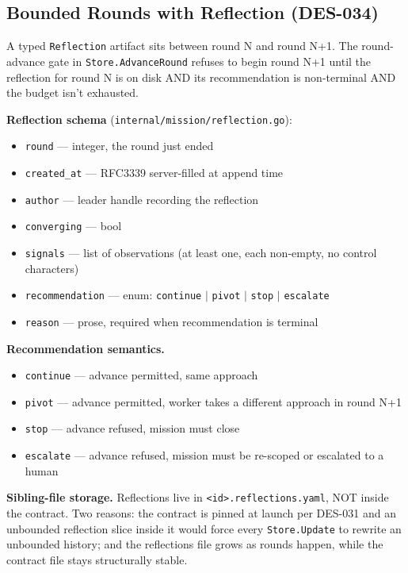 \documentclass[a4paper,10pt]{article}
\newcommand{\field}[1]{\texttt{#1}}
\newcommand{\fpath}[1]{\texttt{#1}}
\begin{document}
\subsection{Bounded Rounds with Reflection (DES-034)}

A typed \texttt{Reflection} artifact sits between round N and round
N+1.  The round-advance gate in \texttt{Store.AdvanceRound} refuses
to begin round N+1 until the reflection for round N is on disk AND
its recommendation is non-terminal AND the budget isn't exhausted.

\textbf{Reflection schema} (\fpath{internal/mission/reflection.go}):

\begin{itemize}
  \item \field{round} --- integer, the round just ended
  \item \field{created\_at} --- RFC3339 server-filled at append time
  \item \field{author} --- leader handle recording the reflection
  \item \field{converging} --- bool
  \item \field{signals} --- list of observations (at least one,
    each non-empty, no control characters)
  \item \field{recommendation} --- enum:
    \texttt{continue} $|$ \texttt{pivot} $|$ \texttt{stop} $|$
    \texttt{escalate}
  \item \field{reason} --- prose, required when recommendation is
    terminal
\end{itemize}

\textbf{Recommendation semantics.}

\begin{itemize}
  \item \texttt{continue} --- advance permitted, same approach
  \item \texttt{pivot} --- advance permitted, worker takes a
    different approach in round N+1
  \item \texttt{stop} --- advance refused, mission must close
  \item \texttt{escalate} --- advance refused, mission must be
    re-scoped or escalated to a human
\end{itemize}

\textbf{Sibling-file storage.}  Reflections live in
\fpath{<id>.reflections.yaml}, NOT inside the contract.  Two
reasons: the contract is pinned at launch per DES-031 and an
unbounded reflection slice inside it would force every
\texttt{Store.Update} to rewrite an unbounded history; and the
reflections file grows as rounds happen, while the contract file
stays structurally stable.
\end{document}
